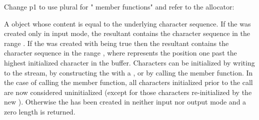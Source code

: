 \documentclass[ebook,11pt,article]{memoir}
\begin{document}
Change p1 to use plural for " member functions" and refer to the allocator:

\begin{itemdescr}
\pnum
\returns
A
object whose content is equal to the
underlying character sequence.
If the  was created only in input mode, the resultant
 contains the character sequence in the range
. If the  was created with
 being true then the resultant 
contains the character sequence in the range , where
 represents the position one past the highest initialized character
in the buffer. Characters can be initialized by writing to the stream, by constructing
the  with a , or by calling 
the
 member function. In the case of calling 
the
 member function, all characters initialized prior to
the call are now considered uninitialized (except for those characters re-initialized
by the new ). Otherwise the  has been created
in neither input nor output mode and a zero length  is returned. 
\end{itemdescr}
\end{document}

